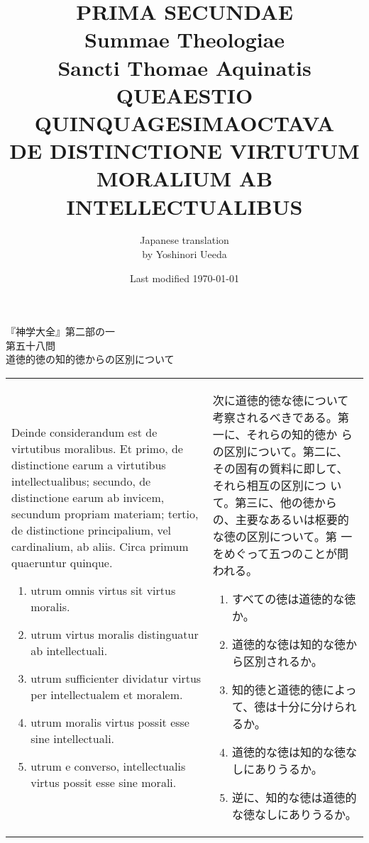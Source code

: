 \documentclass[10pt]{jsarticle}
\title{{\bf PRIMA SECUNDAE}\\{\HUGE Summae Theologiae}\\Sancti Thomae
Aquinatis\\{\sffamily QUEAESTIO QUINQUAGESIMAOCTAVA}\\DE DISTINCTIONE
VIRTUTUM MORALIUM AB INTELLECTUALIBUS}
\author{Japanese translation\\by Yoshinori {\sc Ueeda}}
\date{Last modified \today}
\begin{document}
\maketitle

\begin{center}
{\LARGE 『神学大全』第二部の一}\\
{\Large 第五十八問\\道徳的徳の知的徳からの区別について}
\end{center}


\begin{longtable}{p{21em}p{21em}}
Deinde considerandum est de virtutibus moralibus. Et primo, de
distinctione earum a virtutibus intellectualibus; secundo, de
distinctione earum ab invicem, secundum propriam materiam; tertio, de
distinctione principalium, vel cardinalium, ab aliis. Circa primum
quaeruntur quinque.

\begin{enumerate}
 \item utrum omnis virtus sit virtus moralis.
 \item utrum virtus moralis distinguatur ab intellectuali.
 \item utrum sufficienter dividatur virtus per intellectualem et moralem.
 \item utrum moralis virtus possit esse sine intellectuali.
 \item utrum e converso, intellectualis virtus possit esse sine
 morali.
\end{enumerate}

&

次に道徳的徳な徳について考察されるべきである。第一に、それらの知的徳か
らの区別について。第二に、その固有の質料に即して、それら相互の区別につ
いて。第三に、他の徳からの、主要なあるいは枢要的な徳の区別について。第
一をめぐって五つのことが問われる。

\begin{enumerate}
 \item すべての徳は道徳的な徳か。
 \item 道徳的な徳は知的な徳から区別されるか。
 \item 知的徳と道徳的徳によって、徳は十分に分けられるか。
 \item 道徳的な徳は知的な徳なしにありうるか。
 \item 逆に、知的な徳は道徳的な徳なしにありうるか。
\end{enumerate}
\end{longtable}
\newpage
\end{document}
